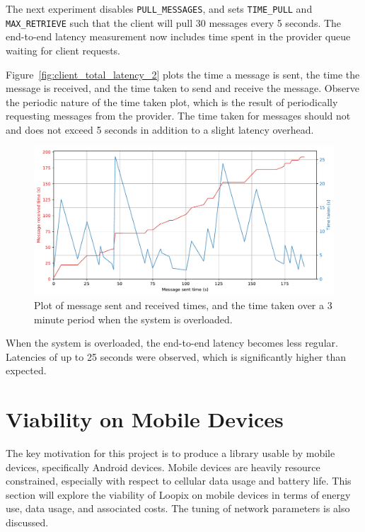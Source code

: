 \documentclass[final,dissertation.tex]{subfiles}
\begin{document}
The next experiment disables \verb|PULL_MESSAGES|, and sets \verb|TIME_PULL| and \verb|MAX_RETRIEVE| such that the client will pull 30 messages every 5 seconds. The end-to-end latency measurement now includes time spent in the provider queue waiting for client requests.

Figure~\ref{fig:client_total_latency_2} plots the time a message is sent, the time the message is received, and the time taken to send and receive the message. Observe the periodic nature of the time taken plot, which is the result of periodically requesting messages from the provider. The time taken for messages should not and does not exceed 5 seconds in addition to a slight latency overhead.

\begin{figure}[h]
	\includegraphics[width=\linewidth]{../figs/client_total_latency}
	\caption{Plot of message sent and received times, and the time taken over a 3 minute period when the system is overloaded.}
	\label{fig:client_total_latency}
\end{figure}

When the system is overloaded, the end-to-end latency becomes less regular. Latencies of up to 25 seconds were observed, which is significantly higher than expected.

\section{Viability on Mobile Devices}

The key motivation for this project is to produce a library usable by mobile devices, specifically Android devices. Mobile devices are heavily resource constrained, especially with respect to cellular data usage and battery life. This section will explore the viability of Loopix on mobile devices in terms of energy use, data usage, and associated costs. The tuning of network parameters is also discussed.
\end{document}
